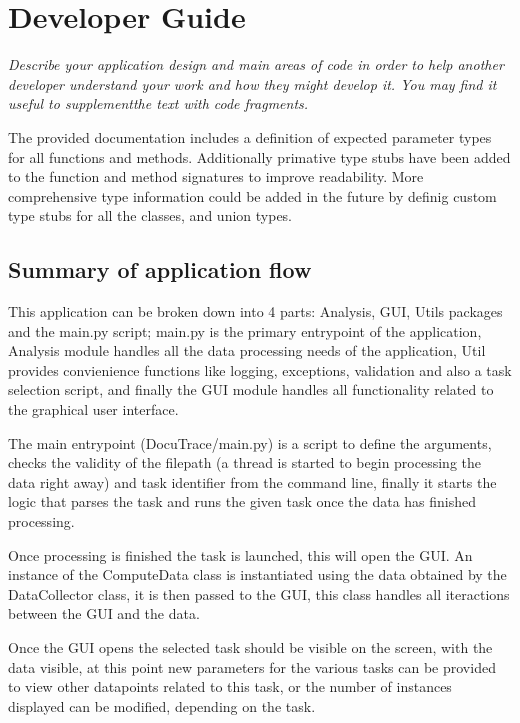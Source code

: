 \documentclass[11pt]{article}
\begin{document}
\section{Developer Guide}
\emph{Describe your application design and main areas of code in order to help another developer understand your work and how they might develop it. You may find it useful to supplementthe text with code fragments.}

The provided documentation includes a definition of expected parameter types for all functions and methods. 
Additionally primative type stubs have been added to the function and method signatures to improve readability.
More comprehensive type information could be added in the future by definig custom type stubs for all the classes, and union types.


\subsection{Summary of application flow}
This application can be broken down into 4 parts: Analysis, GUI, Utils packages and the main.py script; 
main.py is the primary entrypoint of the application, Analysis module handles all the data processing needs of the application, Util provides convienience functions like logging, exceptions, validation and also a task selection script, and finally the GUI module handles all functionality related to the graphical user interface. 

The main entrypoint (DocuTrace/main.py) is a script to define the arguments, checks the validity of the filepath (a thread is started to begin processing the data right away) and task identifier from the command line, finally it starts the logic that parses the task and runs the given task once the data has finished processing.

Once processing is finished the task is launched, this will open the GUI. 
An instance of the ComputeData class is instantiated using the data obtained by the DataCollector class, it is then passed to the GUI, this class handles all iteractions between the GUI and the data.

Once the GUI opens the selected task should be visible on the screen, with the data visible, at this point new parameters for the various tasks can be provided to view other datapoints related to this task, or the number of instances displayed can be modified, depending on the task.
\end{document}

